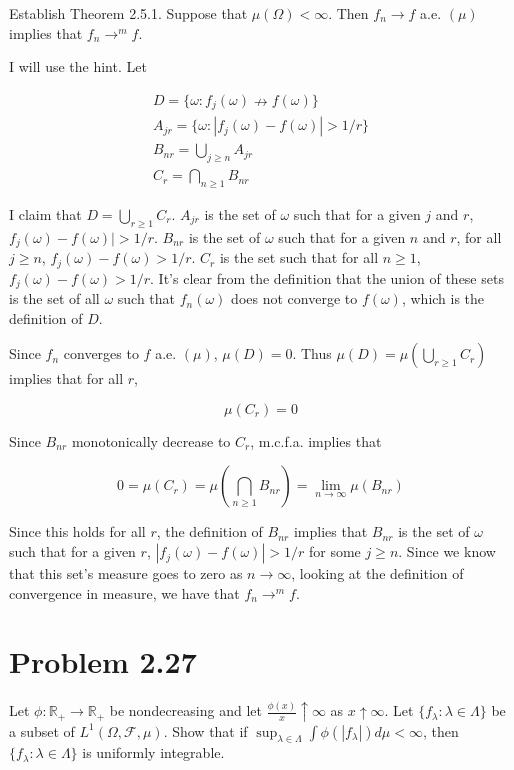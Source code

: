 \documentclass{article}
\newcommand{\R}{\mathbb{R}}
\newcommand{\F}{\mathcal{F}}
\begin{document}
Establish Theorem 2.5.1. Suppose that $\mu(\Omega) < \infty$. Then $f_n \rightarrow f$ a.e. $(\mu)$ implies that $f_n \rightarrow^m f$.

I will use the hint. Let

\begin{gather*}
D = \{ \omega: f_j(\omega) \nrightarrow f(\omega) \} \\
A_{jr} = \{\omega: |f_j(\omega)-f(\omega)| > 1/r \} \\
B_{nr} = \bigcup_{j \geq n} A_{jr} \\
C_r = \bigcap_{n \geq 1} B_{nr}
\end{gather*}

I claim that $D = \bigcup_{r \geq 1} C_r$. $A_{jr}$ is the set of $\omega$ such that for a given $j$ and $r$, $f_j(\omega)-f(\omega)| > 1/r$. $B_{nr}$ is the set of $\omega$ such that for a given $n$ and $r$, for all $j \geq n$, $f_j(\omega) - f(\omega) > 1/r$. $C_{r}$ is the set such that for all $n \geq 1$, $f_j(\omega) - f(\omega) > 1/r$. It's clear from the definition that the union of these sets is the set of all $\omega$ such that $f_n(\omega)$ does not converge to $f(\omega)$, which is the definition of $D$.

Since $f_n$ converges to $f$ a.e. $(\mu)$, $\mu(D) = 0$. Thus $\mu(D) = \mu(\bigcup_{r \geq 1} C_r)$ implies that for all $r$,

\[
\mu(C_r) = 0
\]

Since $B_{nr}$ monotonically decrease to $C_{r}$, m.c.f.a. implies that

\[
0 = \mu(C_r) = \mu(\bigcap_{n \geq 1}B_{nr}) = \lim_{n \rightarrow \infty} \mu(B_{nr})
\]

Since this holds for all $r$, the definition of $B_{nr}$ implies that $B_{nr}$ is the set of $\omega$ such that for a given $r$, $|f_j(\omega) - f(\omega)| > 1/r$ for some $j \geq n$. Since we know that this set's measure goes to zero as $n \rightarrow \infty$, looking at the definition of convergence in measure, we have that $f_n \rightarrow^m f$.

\section*{Problem 2.27}

Let $\phi: \R_+ \rightarrow \R_+$ be nondecreasing and let $\frac{\phi(x)}{x} \uparrow \infty$ as $x \uparrow \infty$. Let $\{ f_\lambda: \lambda \in \Lambda \}$ be a subset of $L^1(\Omega, \F, \mu)$. Show that if $\sup_{\lambda \in \Lambda} \int \phi(|f_\lambda|)d\mu < \infty$, then $\{ f_\lambda: \lambda \in \Lambda \}$ is uniformly integrable.
\end{document}
